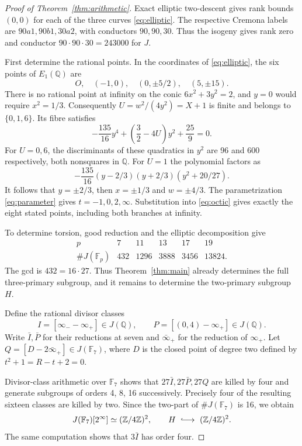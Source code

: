 \documentclass[11pt,reqno]{amsart}
\theoremstyle{remark}
\newcommand{\Q}{\mathbb Q}
\newcommand{\Z}{\mathbb Z}
\newcommand{\F}{\mathbb F}
\begin{document}
\begin{proof}[Proof of Theorem~\ref{thm:arithmetic}]
Exact elliptic two-descent gives rank bounds \((0,0)\) for each
of the three curves \eqref{eq:elliptic}.
The respective Cremona labels are \(90a1,90b1,30a2\), with conductors
\(90,90,30\). Thus the isogeny gives rank zero and conductor
\(90\cdot90\cdot30=243000\) for \(J\).

First determine the rational points. In the coordinates of
\eqref{eq:elliptic}, the six points of \(E_1(\Q)\) are
\[
 O,\quad(-1,0),\quad(0,\pm5/2),\quad(5,\pm15).
\]
There is no rational point at infinity on the conic
\(6x^2+3y^2=2\), and \(y=0\) would require \(x^2=1/3\).
Consequently \(U=w^2/(4y^2)=X+1\) is finite and belongs to
\(\{0,1,6\}\). Its fibre satisfies
\[
 -\frac{135}{16}y^4+\left(\frac32-4U\right)y^2+\frac{25}{9}=0.
\]
For \(U=0,6\), the discriminants of these quadratics in \(y^2\)
are 96 and 600 respectively, both nonsquares in \(\Q\).
For \(U=1\) the polynomial factors as
\[
 -\frac{135}{16}(y-2/3)(y+2/3)(y^2+20/27).
\]
It follows that \(y=\pm2/3\), then \(x=\pm1/3\) and
\(w=\pm4/3\). The parametrization \eqref{eq:parameter} gives
\(t=-1,0,2,\infty\). Substitution into \eqref{eq:octic} gives
exactly the eight stated points, including both branches at infinity.

To determine torsion, good reduction and the elliptic decomposition give
\[
\begin{array}{c|rrrrr}
 p&7&11&13&17&19\\ \hline
 \#J(\F_p)&432&1296&3888&3456&13824.
\end{array}
\]
The gcd is \(432=16\cdot27\). Thus Theorem~\ref{thm:main}
already determines the full three-primary subgroup, and it remains
to determine the two-primary subgroup \(H\).

\begin{samepage}
Define the rational divisor classes
\[
 I=[\infty_- -\infty_+]\in J(\Q),\qquad
 P=[(0,4)-\infty_+]\in J(\Q).
\]
Write \(\bar I,\bar P\) for their reductions at seven and
\(\bar\infty_+\) for the reduction of \(\infty_+\).
Let \(Q=[D-2\bar\infty_+]\in J(\F_7)\), where \(D\) is the closed point
of degree two defined by \(t^2+1=R-t+2=0\).

\end{samepage}
Divisor-class arithmetic over \(\F_7\) shows that \(27\bar I,27\bar P,27Q\)
are killed by four and generate subgroups of orders 4, 8, 16 successively.
Precisely four of the resulting sixteen classes are killed by two.
Since the two-part of \(\#J(\F_7)\) is 16, we obtain
\[
 J(\F_7)[2^\infty]\simeq(\Z/4\Z)^2,
 \qquad H\ \lhook\joinrel\longrightarrow\ (\Z/4\Z)^2.
\]
The same computation shows that \(3\bar I\) has order four.


\end{proof}
\end{document}
